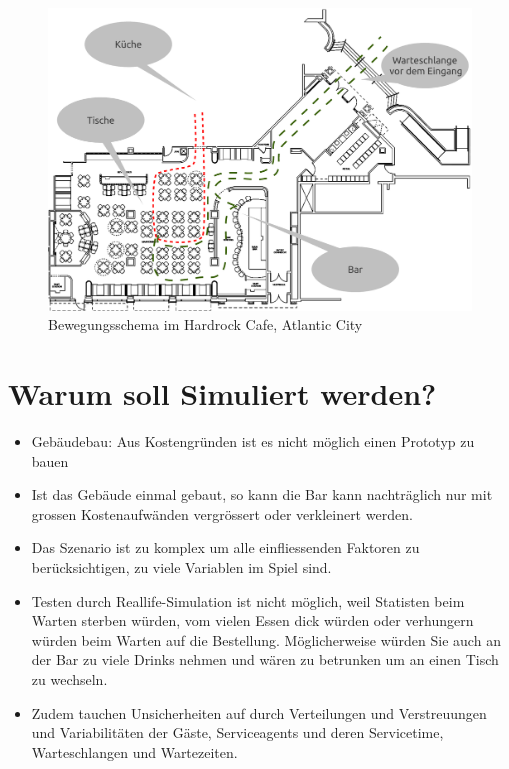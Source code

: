 \documentclass[ngerman,a4paper,12pt]{scrreprt}
\begin{document}
\begin{figure}[H]
	\centering
		\includegraphics[width=1\textwidth]{img/hardrockSchema.pdf}
		\caption[Bewegungsschema Hardrock]{Bewegungsschema im Hardrock Cafe, Atlantic City}
		\label{schemaHardrock}
\end{figure}



\section{Warum soll Simuliert werden?}
\begin{itemize}
	\item Gebäudebau: Aus Kostengründen ist es nicht möglich einen Prototyp zu bauen
	\item Ist das Gebäude einmal gebaut, so kann die Bar kann nachträglich nur mit grossen Kostenaufwänden vergrössert oder verkleinert werden.
	\item Das Szenario ist zu komplex um alle einfliessenden Faktoren zu berücksichtigen, zu viele Variablen im Spiel sind.
	\item Testen durch Reallife-Simulation ist nicht möglich, weil Statisten beim Warten sterben würden, vom vielen Essen dick würden oder verhungern würden beim Warten auf die Bestellung. Möglicherweise würden Sie auch an der Bar zu viele Drinks nehmen und wären zu betrunken um an einen Tisch zu wechseln.
	\item Zudem tauchen Unsicherheiten auf durch Verteilungen und Verstreuungen und Variabilitäten der Gäste, Serviceagents und deren Servicetime, Warteschlangen und Wartezeiten.
\end{itemize}
\end{document}
